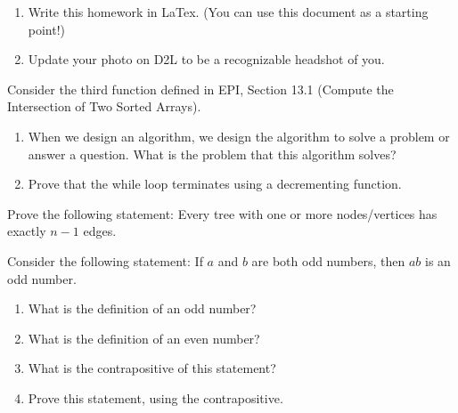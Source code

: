 \documentclass{article}
\author{TODO-Your Name Here}
\date{due: 6 September 2019}
\begin{document}
\nextprob
\begin{enumerate}
    \item Write this homework in LaTex.  (You can use this document as a
        starting point!)
    \item Update your photo on D2L to be a recognizable headshot of you.
\end{enumerate}

\nextprob
Consider the third function defined in EPI, Section 13.1 (Compute the
Intersection of Two Sorted Arrays).
\begin{enumerate}
    \item When we design an algorithm, we design the algorithm to solve a
        problem or answer a question.  What is the problem that this algorithm
        solves?
    \item Prove that the while loop terminates using a decrementing function.
\end{enumerate}

\nextprob
Prove the following statement: Every tree with one or more nodes/vertices has
exactly $n-1$ edges.

\nextprob
Consider the following statement: If $a$ and $b$ are both odd numbers, then $ab$ is
an odd number.
\begin{enumerate}
    \item What is the definition of an odd number?
    \item What is the definition of an even number?
    \item What is the contrapositive of this statement?
    \item Prove this statement, using the contrapositive.
\end{enumerate}
\end{document}
